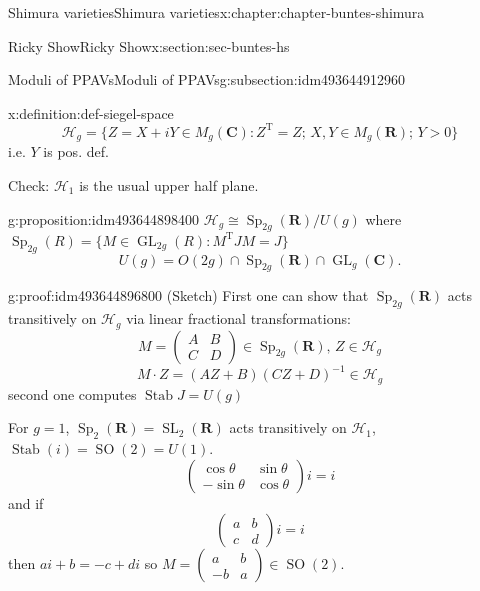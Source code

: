 \documentclass[oneside,10pt,]{book}
\numberwithin{equation}{section}
\newcommand{\inv}{^{-1}}
\newcommand{\RR}{\mathbf{R}}
\newcommand{\CC}{\mathbf{C}}
\newcommand{\transpose}{\mathrm{T}}
\DeclareMathOperator{\Stab}{Stab}
\DeclareMathOperator{\SL}{SL}
\DeclareMathOperator{\GL}{GL}
\DeclareMathOperator{\specialorthogonal}{SO}
\DeclareMathOperator{\Sp}{Sp}
\newcommand{\gt}{>}
\newcommand{\amp}{&}
\begin{document}
\begin{chapterptx}{Shimura varieties}{}{Shimura varieties}{}{}{x:chapter:chapter-buntes-shimura}
\begin{sectionptx}{Ricky Show}{}{Ricky Show}{}{}{x:section:sec-buntes-hs}
\begin{subsectionptx}{Moduli of PPAVs}{}{Moduli of PPAVs}{}{}{g:subsection:idm493644912960}
\begin{definition}{}{x:definition:def-siegel-space}
\begin{equation*}
\mathscr H_g = \{ Z = X+iY \in M_g(\CC) : Z^\transpose  = Z ; \, X,Y \in M_g(\RR); \, Y \gt 0\}
\end{equation*}
i.e. \(Y\) is pos. def.%
\end{definition}
Check: \(\mathscr H_1\) is the usual upper half plane.%
\begin{proposition}{}{}{g:proposition:idm493644898400}%
\(\mathscr H_g \cong \Sp_{2g}(\RR)/U(g)\) where \(\Sp_{2g} (R) = \{ M \in \GL_{2g}(R) : M^\transpose J M = J\}\)%
\begin{equation*}
U(g) = O(2g) \cap \Sp_{2g}(\RR) \cap \GL_{g}(\CC)\text{.}
\end{equation*}
%
\end{proposition}
\begin{proofptx}{}{g:proof:idm493644896800}
(Sketch) First one can show that \(\Sp_{2g}(\RR)\) acts transitively on \(\mathscr H_g\) via linear fractional transformations:%
\begin{equation*}
M = \begin{pmatrix} A\amp B\\ C\amp D\end{pmatrix} \in \Sp_{2g}(\RR),\, Z\in \mathscr H_g
\end{equation*}
%
\begin{equation*}
M\cdot Z = (AZ+B)(CZ+D)\inv \in \mathscr H_g
\end{equation*}
second one computes \(\Stab J = U(g)\)%
\par
For \(g= 1\), \(\Sp_2(\RR) = \SL_2(\RR)\) acts transitively on \(\mathscr H_1\), \(\Stab(i) = \specialorthogonal (2) = U(1)\).%
\begin{equation*}
\begin{pmatrix} \cos \theta\amp \sin \theta \\ - \sin \theta \amp \cos \theta \end{pmatrix} i = i
\end{equation*}
and if%
\begin{equation*}
\begin{pmatrix} a \amp b \\ c \amp d\end{pmatrix} i = i
\end{equation*}
then \(ai + b = -c + di\) so \(M= \begin{pmatrix} a\amp b\\ -b \amp a \end{pmatrix}\in \specialorthogonal(2)\).%
\end{proofptx}

\end{subsectionptx}
\end{sectionptx}
\end{chapterptx}
\end{document}
